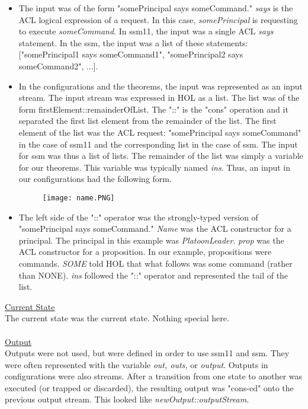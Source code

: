   \begin{itemize}
  \item The input was of the form "somePrincipal says someCommand."  \textit{says} is the ACL
    logical expression of a request.   In this case, \textit{somePrincipal} is requesting to
    execute \textit{someCommand}.  In ssm11, the input was a single ACL \textit{says} statement.
    In the ssm, the input was a list of these statements:  ["somePrincipal1 says someCommand1",
    "somePrincipal2 says someCommand2", ...].
  \item In the configurations and the theorems, the input was represented as an input stream.
    The input stream was expressed in HOL as a list.  The list was of the form firstElement::remainderOfList.
    The "::" is the "cons" operation and it separated the first list element from the remainder of the
    list.  The first element of the list was the ACL request: "somePrincipal says someCommand" in the
    case of ssm11 and the corresponding list in the case of ssm.   The input for ssm was thus a list of
    lists.  The remainder of the list was simply a variable for our theorems.  This variable was typically
    named \textit{ins}.  Thus, an input in our configurations had the following form.
    \begin{figure}[h]
  \centering
  \texttt{[image: name.PNG]}
\end{figure}
\item The left side of the "::" operator was the strongly-typed version of "somePrincipal says
  someCommand."  \textit{Name} was the ACL constructor for a principal.  The principal in this
  example was \textit{PlatoonLeader}. \textit{prop} was the ACL constructor for a proposition.
  In our example, propositions were commands.  \textit{SOME} told HOL that what follows was some
  command (rather than NONE).   \textit{ins} followed the "::" operator and represented the tail
  of the list.\\
\end{itemize}
\underline{Current State}\\
The current state was the current state.  Nothing special here.\\\\
\underline{Output}\\
Outputs were not used, but were defined in order to use ssm11 and ssm.  They were often represented
with the variable \textit{out, outs,} or \textit{output}.  Outputs in configurations were also streams.
After a transition from one state to another was executed (or trapped or discarded), the resulting
output was "cons-ed" onto the previous output stream.  This looked like \textit{newOutput::outputStream}.


